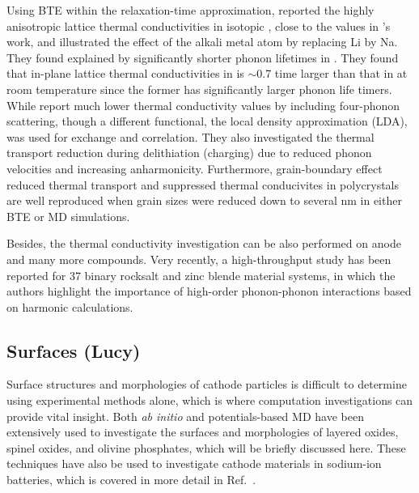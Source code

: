 \documentclass[../main.tex]{subfiles}
\begin{document}
Using BTE within the relaxation-time approximation, \citeauthor{mattila2020lattice} reported the highly anisotropic lattice thermal conductivities in isotopic , close to the values in \citeauthor{yang2019highly}'s work\cite{yang2019highly,yang2020chemical}, and illustrated the effect of the alkali metal atom by replacing Li by Na.\cite{mattila2020lattice} They found explained by significantly shorter phonon lifetimes in . They found that in-plane lattice thermal conductivities in  is $\sim$0.7 time larger than that in  at room temperature since the former has significantly larger phonon life timers. While \citeauthor{feng2020quantum} report much lower thermal conductivity values by including four-phonon scattering, though a different functional, the local density approximation (LDA), was used for exchange and correlation.\cite{feng2020quantum} They also investigated the thermal transport reduction during delithiation (charging) due to reduced phonon velocities and increasing anharmonicity. Furthermore, grain-boundary effect reduced thermal transport and  suppressed thermal conducivites in polycrystals are well reproduced when grain sizes were reduced down to several nm in either BTE or MD simulations. \cite{he2019thermal}

Besides, the thermal conductivity investigation can be also performed on anode and many more compounds.\cite{qian2016anisotropic, wei2018tunable} Very recently, a high-throughput study has been reported for 37 binary rocksalt and zinc blende material systems, in which the authors highlight the importance of high-order phonon-phonon interactions based on harmonic calculations. \cite{xia2020high}

\subsection{Surfaces (Lucy)}
Surface structures and morphologies of cathode particles is difficult to determine using experimental methods alone, which is where computation investigations can provide vital insight.\cite{zhang2013nanomaterials} Both \textit{ab initio} and potentials-based MD have been extensively used to investigate the surfaces and morphologies of layered oxides, spinel oxides, and olivine phosphates, which will be briefly discussed here. These techniques have also be used to investigate cathode materials in sodium-ion batteries, which is covered in more detail in Ref.~.
\end{document}
